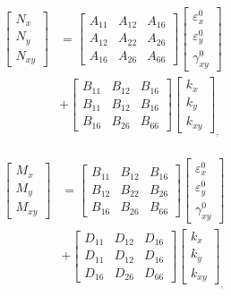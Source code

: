 \begin{equation} \label{eq:force_and_moments}
	\begin{array}{l}
		\begin{aligned}
	\begin{bmatrix}
		N_x \\
		N_y \\
		N_{xy}
	\end{bmatrix}
	&=
	\begin{bmatrix}
		A_{11} & A_{12} & A_{16} \\
		A_{12} & A_{22} & A_{26} \\
		A_{16} & A_{26} & A_{66} 
	\end{bmatrix}
    \begin{bmatrix}
		\varepsilon_x^0 \\
        \varepsilon_y^0 \\
		\gamma_{xy}^0
    \end{bmatrix}   \\
	&+               
	\begin{bmatrix}
		B_{11} & B_{12} & B_{16} \\
		B_{11} & B_{12} & B_{16} \\
		B_{16} & B_{26} & B_{66} 
	\end{bmatrix}
	\begin{bmatrix}
		k_x \\
		k_y \\
		k_{xy} 
	\end{bmatrix}_{\textstyle ,}  \\
\end{aligned} \\ \\
\begin{aligned}
	\begin{bmatrix}
		M_x \\
		M_y \\
		M_{xy}
	\end{bmatrix}
	&=
	\begin{bmatrix}
		B_{11} & B_{12} & B_{16} \\
		B_{12} & B_{22} & B_{26} \\
		B_{16} & B_{26} & B_{66} 
	\end{bmatrix}
    \begin{bmatrix}
		\varepsilon_x^0 \\
        \varepsilon_y^0 \\
		\gamma_{xy}^0
    \end{bmatrix} \\ 
	&+  
	\begin{bmatrix}
		D_{11} & D_{12} & D_{16} \\
		D_{11} & D_{12} & D_{16} \\
		D_{16} & D_{26} & D_{66} 
	\end{bmatrix}
	\begin{bmatrix}
		k_x \\
		k_y \\
		k_{xy} 
	\end{bmatrix}_{\textstyle,}
\end{aligned}
	\end{array}
\end{equation}

